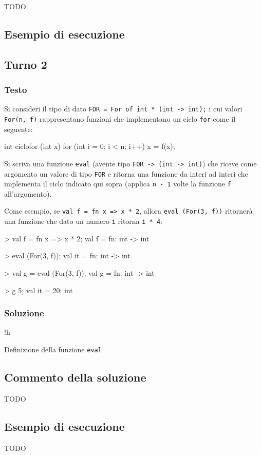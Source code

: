 TODO

\subsection*{Esempio di esecuzione}

\subsection{Turno 2}

\subsubsection{Testo}

Si consideri il tipo di dato \texttt{FOR = For of int * (int -> int);} i cui valori \texttt{For(n, f)} rappresentano funzioni che implementano un ciclo \texttt{for} come il seguente:

\begin{cppcode}
int ciclofor (int x) {
	for (int i = 0; i < n; i++) {
		x = f(x);
	}
}
\end{cppcode}

Si scriva una funzione \texttt{eval} (avente tipo \texttt{FOR -> (int -> int)}) che riceve come argomento un valore di tipo \texttt{FOR} e ritorna una funzione da interi ad interi che implementa il ciclo indicato qui sopra (applica \texttt{n - 1} volte la funzione \texttt{f} all'argomento).

\medskip
Come esempio, se \texttt{val f = fn x => x * 2}, allora \texttt{eval (For(3, f))} ritornerà una funzione che dato un numero \texttt{i} ritorna \texttt{i * 4}:

\begin{smlcode}
> val f = fn x => x * 2;
val f = fn: int -> int

> eval (For(3, f));
val it = fn: int -> int

> val g = eval (For(3, f));
val g = fn: int -> int

> g 5;
val it = 20: int
\end{smlcode}

\subsubsection{Soluzione}

\begin{listing}{!h}
\caption[]{Definizione della funzione \texttt{eval}}
\end{listing}

\subsection{Commento della soluzione}

TODO

\subsection*{Esempio di esecuzione}

TODO
